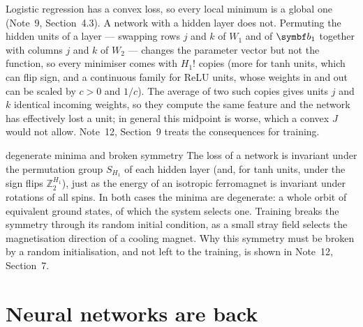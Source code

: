 \documentclass[11pt]{article}
\newcommand{\vb}{\vect{b}}
\begin{document}
Logistic regression has a convex loss, so every local minimum is a global one (Note~9, Section~4.3). A network with a
hidden layer does not. Permuting the hidden units of a layer --- swapping rows $j$ and
$k$ of $W_1$ and of $\vb_1$ together with columns $j$ and $k$ of $W_2$ --- changes the parameter vector but not the
function, so every minimiser comes with $H_1!$ copies (more for tanh units, which can flip sign, and a continuous family
for ReLU units, whose weights in and out can be scaled by $c > 0$ and $1/c$). The average of two
such copies gives units $j$ and $k$ identical incoming weights, so they compute the same feature and the network has
effectively lost a unit; in general this midpoint is worse, which a convex $J$ would not allow. Note~12, Section~9
treats the consequences for training.

\begin{physics}{degenerate minima and broken symmetry}
The loss of a network is invariant under the permutation group $S_{H_1}$ of each hidden layer (and, for tanh units,
under the sign flips $\mathbb{Z}_2^{H_1}$), just as the energy of an isotropic ferromagnet is invariant under
rotations of all spins. In both cases the minima are degenerate: a whole orbit of equivalent ground states, of which
the system selects one. Training breaks the symmetry through its random initial condition, as a small stray field
selects the magnetisation direction of a cooling magnet. Why this symmetry must be broken by a random initialisation,
and not left to the training, is shown in Note~12, Section~7.
\end{physics}

\section{Neural networks are back}\label{sec:history}
\end{document}
